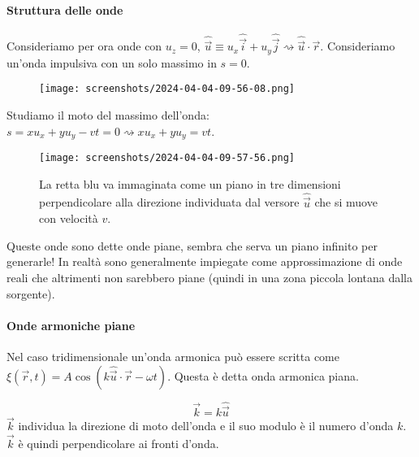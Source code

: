 \paragraph{Struttura delle onde}
Consideriamo per ora onde con \(u_z = 0\), \(\hat{\vec{u}} \equiv u_x \hat{\vec{i}} + u_y \hat{\vec{j}} \rightsquigarrow \hat{\vec{u}} \cdot \vec{r}\). Consideriamo un'onda impulsiva con un solo massimo in \(s=0\).
\begin{figure}[H]
	\centering
	\texttt{[image: screenshots/2024-04-04-09-56-08.png]}
\end{figure}
Studiamo il moto del massimo dell'onda: \(s=xu_x + yu_y - vt = 0 \rightsquigarrow xu_x + yu_y = vt\).
\begin{figure}[H]
	\centering
	\texttt{[image: screenshots/2024-04-04-09-57-56.png]}
	\caption{La retta blu va immaginata come un piano in tre dimensioni perpendicolare alla direzione individuata dal versore \(\hat{\vec{u}} \) che si muove con velocità \(v\).}
\end{figure}
Queste onde sono dette onde piane, sembra che serva un piano infinito per generarle! In realtà sono generalmente impiegate come approssimazione di onde reali che altrimenti non sarebbero piane (quindi in una zona piccola lontana dalla sorgente).

\paragraph{Onde armoniche piane}
Nel caso tridimensionale un'onda armonica può essere scritta come \(\xi (\vec{r},t ) = A \cos (k \hat{\vec{u}} \cdot \vec{r} - \omega t)\). Questa è detta onda armonica piana.
\begin{definition}
	\[
		\vec{k} = k \hat{\vec{u}} 
	\]
	\(\vec{k}\) individua la direzione di moto dell'onda e il suo modulo è il numero d'onda \(k\). \(\vec{k}\) è quindi perpendicolare ai fronti d'onda.
\end{definition}
